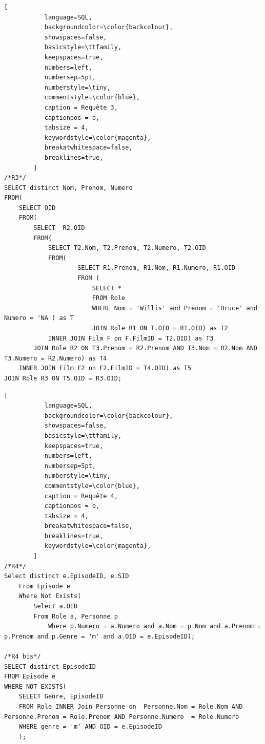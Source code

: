 \documentclass[10pt,a4paper]{article}
\begin{document}
\begin{lstlisting}[
           language=SQL,
           backgroundcolor=\color{backcolour},
           showspaces=false,
           basicstyle=\ttfamily,
           keepspaces=true,                 
           numbers=left,                    
           numbersep=5pt,
           numberstyle=\tiny,
           commentstyle=\color{blue},
           caption = Requête 3,
           captionpos = b,
           tabsize = 4,
           keywordstyle=\color{magenta},
           breakatwhitespace=false,         
           breaklines=true,
        ]
/*R3*/
SELECT distinct Nom, Prenom, Numero
FROM(
	SELECT OID
	FROM(
		SELECT 	R2.OID
		FROM(
			SELECT T2.Nom, T2.Prenom, T2.Numero, T2.OID
			FROM(
					SELECT R1.Prenom, R1.Nom, R1.Numero, R1.OID
					FROM (
						SELECT *
						FROM Role
						WHERE Nom = 'Willis' and Prenom = 'Bruce' and Numero = 'NA') as T
						JOIN Role R1 ON T.OID = R1.OID) as T2
			INNER JOIN Film F on F.FilmID = T2.OID) as T3
		JOIN Role R2 ON T3.Prenom = R2.Prenom AND T3.Nom = R2.Nom AND T3.Numero = R2.Numero) as T4
	INNER JOIN Film F2 on F2.FilmID = T4.OID) as T5
JOIN Role R3 ON T5.OID = R3.OID;
\end{lstlisting}

\begin{lstlisting}[
           language=SQL,
           backgroundcolor=\color{backcolour},
           showspaces=false,
           basicstyle=\ttfamily,
           keepspaces=true,                 
           numbers=left,                    
           numbersep=5pt,
           numberstyle=\tiny,
           commentstyle=\color{blue},
           caption = Requête 4,
           captionpos = b,
           tabsize = 4,
           breakatwhitespace=false,         
    	   breaklines=true,
           keywordstyle=\color{magenta},
        ]
/*R4*/
Select distinct e.EpisodeID, e.SID 
	From Episode e 
    Where Not Exists( 
        Select a.OID 
        From Role a, Personne p 
        	Where p.Numero = a.Numero and a.Nom = p.Nom and a.Prenom = p.Prenom and p.Genre = 'm' and a.OID = e.EpisodeID);

/*R4 bis*/
SELECT distinct EpisodeID
FROM Episode e
WHERE NOT EXISTS(
	SELECT Genre, EpisodeID
	FROM Role INNER Join Personne on  Personne.Nom = Role.Nom AND Personne.Prenom = Role.Prenom AND Personne.Numero  = Role.Numero
	WHERE genre = 'm' AND OID = e.EpisodeID
    );
    
\end{lstlisting}
\end{document}
